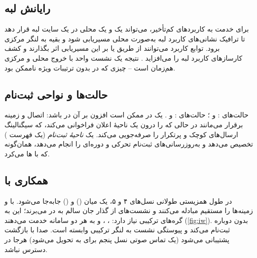 \documentclass[11pt,a4paper]{article}
\begin{document}
\begin{acnfigure}
  \caption{یک نشست  با طبقه‌بند فراسو و دو لنگر: خروج محلی لبه و دسترسی مرکزی به اینترنت.}
  \label{fig:upf}
\end{acnfigure}

\subsection{رایانش لبه}
برای خدمت به کاربردهای کم‌تأخیر،  می‌تواند یک  و یک  محلی در یک سایت لبه قرار دهد تا ترافیک
نشانی‌های کاربرد لبه به‌صورت محلی مسیریابی شود و بقیه به لنگر مرکزی برود. توابع کاربرد می‌توانند از طریق  یا 
بر این مسیریابی اثر بگذارند و  کشف کارسازهای کاربرد لبه را می‌افزاید \cite{ts23548}. نتیجه یک نشست 
واحد با خروج محلی و مرکزی هم‌زمان است -- چیزی که در  بدون ترتیبات ویژه ناممکن بود.

\subsection{حالت‌ها و نواحی ثبت‌نام}
حالت‌های :  و ؛ حالت‌های :  و . یک 
در  ممکن است افزون بر آن در  باشد: اتصال  و زمینه برقرار می‌مانند در حالی که 
 را درون یک ناحیهٔ اعلان  فراخوانی می‌کند، که سیگنالینگ ارسال‌های کوچک و پرتکرار را صرفه‌جویی می‌کند.
 یک \emph{ناحیهٔ ثبت‌نام} (یک فهرست ) تخصیص می‌دهد و به‌روزرسانی‌های ثبت‌نام تحرکی و دوره‌ای را انجام می‌دهد،
همان‌گونه که  با ها می‌کرد.

\subsection{همکاری با }
در طول همزیستی طولانی نسل‌های ۴ و ۵، یک  میان  () و  () جابه‌جا می‌شود. با
\emph{}  و  زمینه‌ها را مستقیم مبادله می‌کنند و نشست‌های  از گذار جان سالم به در می‌برند؛ این
به گره‌های ترکیبی نیاز دارد: ، ،  و  به هر دو سامانه خدمت می‌دهند
(\cref{fig:iw}). بدون   دوباره ثبت‌نام می‌کند و پیوستگی نشست به لنگر ترکیبی وابسته است. صدا با بازگشت 
پشتیبانی می‌شود (یک تماس صوتی نسل پنجم برای  به  تحویل می‌شود) هرجا  در دسترس نباشد.
\end{document}
